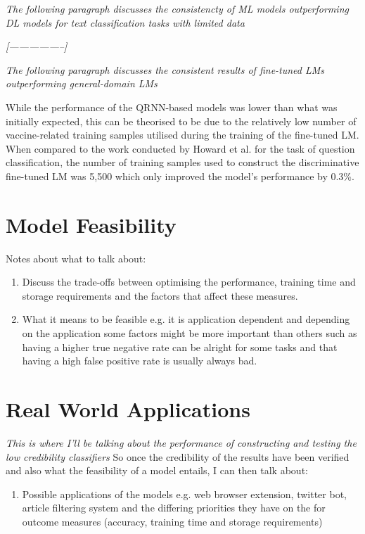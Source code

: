 \documentclass[a4paper,twoside,phd]{BYUPhys}
\begin{document}
\textit{The following paragraph discusses the consistencty of ML models outperforming DL models for text classification tasks with limited data}

\textit{[-----------------]}

\textit{The following paragraph discusses the consistent results of fine-tuned LMs outperforming general-domain LMs}

While the performance of the QRNN-based models was lower than what was initially expected, this can be theorised to be due to the relatively low number of vaccine-related training samples utilised during the training of the fine-tuned LM. When compared to the work conducted by Howard et al. \cite{Howard2018} for the task of question classification, the number of training samples used to construct the discriminative fine-tuned LM was 5,500 which only improved the model's performance by 0.3\%. 

\section{Model Feasibility}
\label{sec:ModelFeasibility}
Notes about what to talk about:
\begin{enumerate}[-]
	\item Discuss the trade-offs between optimising the performance, training time and storage requirements and the factors that affect these measures. 
	\item What it means to be feasible e.g. it is application dependent and depending on the application some factors might be more important than others such as having a higher true negative rate can be alright for some tasks and that having a high false positive rate is usually always bad.
\end{enumerate}

\section{Real World Applications}
\label{sec:RealWorldApplication}
\textit{This is where I'll be talking about the performance of constructing and testing the low credibility classifiers}
So once the credibility of the results have been verified and also what the feasibility of a model entails, I can then talk about:

\begin{enumerate}[-]
	\item Possible applications of the models e.g. web browser extension, twitter bot, article filtering system and the differing priorities they have on the for outcome measures (accuracy, training time and storage requirements)
\end{enumerate}
\end{document}
